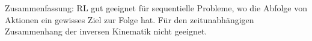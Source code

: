 
























































\vspace{10cm}
\cite{ADBB17}


Zusammenfassung: RL gut geeignet für sequentielle Probleme, wo die Abfolge von Aktionen ein gewisses Ziel zur Folge hat. Für den zeitunabhängigen Zusammenhang der inversen Kinematik nicht geeignet. 